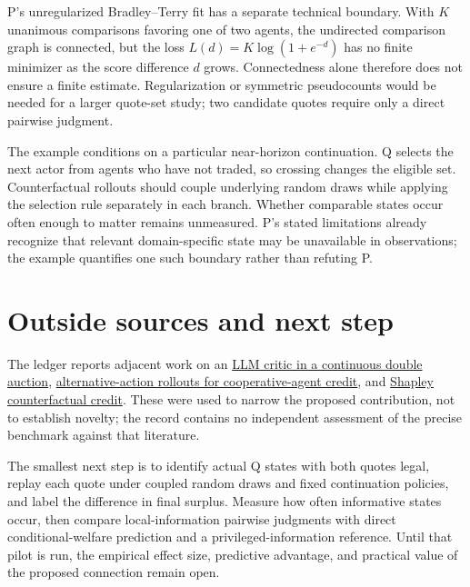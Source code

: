 \documentclass{article}
\begin{document}
P's unregularized Bradley--Terry fit has a separate technical boundary. With \(K\) unanimous comparisons favoring one of two agents, the undirected comparison graph is connected, but the loss \(L(d)=K\log(1+e^{-d})\) has no finite minimizer as the score difference \(d\) grows. Connectedness alone therefore does not ensure a finite estimate. Regularization or symmetric pseudocounts would be needed for a larger quote-set study; two candidate quotes require only a direct pairwise judgment. 

The example conditions on a particular near-horizon continuation. Q selects the next actor from agents who have not traded, so crossing changes the eligible set. Counterfactual rollouts should couple underlying random draws while applying the selection rule separately in each branch. Whether comparable states occur often enough to matter remains unmeasured. P's stated limitations already recognize that relevant domain-specific state may be unavailable in observations; the example quantifies one such boundary rather than refuting P. 

\section{Outside sources and next step}

The ledger reports adjacent work on an \href{https://arxiv.org/abs/2508.18610}{LLM critic in a continuous double auction}, \href{https://arxiv.org/abs/2603.06859}{alternative-action rollouts for cooperative-agent credit}, and \href{https://arxiv.org/abs/2106.00285}{Shapley counterfactual credit}. These were used to narrow the proposed contribution, not to establish novelty; the record contains no independent assessment of the precise benchmark against that literature. 

The smallest next step is to identify actual Q states with both quotes legal, replay each quote under coupled random draws and fixed continuation policies, and label the difference in final surplus. Measure how often informative states occur, then compare local-information pairwise judgments with direct conditional-welfare prediction and a privileged-information reference. Until that pilot is run, the empirical effect size, predictive advantage, and practical value of the proposed connection remain open. 
\end{document}
